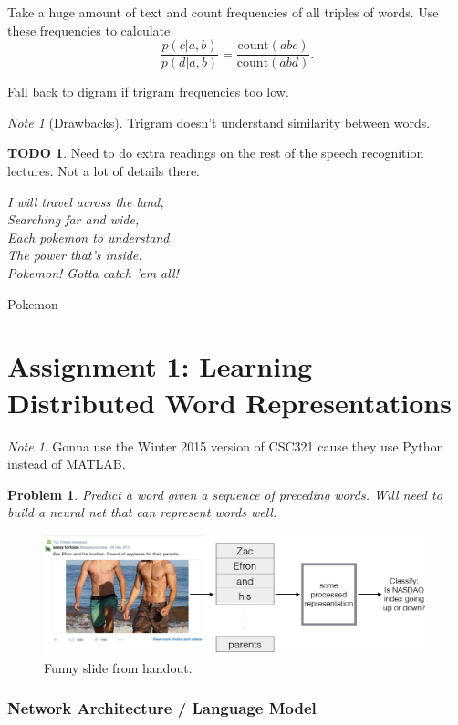 \documentclass[12pt]{article}
\theoremstyle{plain}
\newtheorem{problem}[theorem]{Problem}
\theoremstyle{definition}
\newtheorem{todo}{TODO}
\theoremstyle{remark}
\newtheorem{note}[theorem]{Note}
\begin{document}
Take a huge amount of text and count frequencies of all triples of words. Use these frequencies to calculate 
$$\frac{p(c|a,b)}{p(d|a,b)} = \frac{\mathrm{count}(abc)}{\mathrm{count}(abd)}.$$

Fall back to digram if trigram frequencies too low.

\begin{note}[Drawbacks]
Trigram doesn't understand similarity between words.
\end{note}

\begin{todo}
Need to do extra readings on the rest of the speech recognition lectures. Not a lot of details there.
\end{todo}

\epigraph{\textit{I will travel across the land,\\
Searching far and wide,\\
Each pokemon to understand\\
The power that's inside.\\
Pokemon! Gotta catch 'em all!
}}{Pokemon}

\part{Assignment 1: Learning Distributed Word Representations}

\begin{note}
Gonna use the Winter 2015 version of CSC321 cause they use Python instead of MATLAB.
\end{note}

\begin{problem}
Predict a word given a sequence of preceding words. Will need to build a neural net that can represent words well.
\end{problem}

\begin{figure}[H]
\centering
\includegraphics[width=1.0\textwidth]{zacefron}
\caption{Funny slide from handout.}
\end{figure}

\section{Network Architecture / Language Model}
\end{document}
